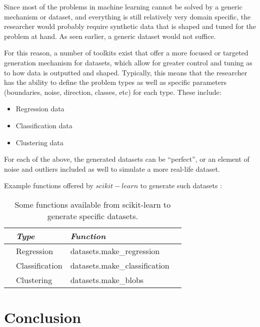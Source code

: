 Since most of the problems in machine learning cannot be solved by a generic mechanism or dataset, and everything is still relatively very domain specific, the researcher would probably require synthetic data that is shaped and tuned for the problem at hand. As seen earlier, a generic dataset would not suffice.

For this reason, a number of toolkits exist that offer a more focused or targeted generation mechanism for datasets, which allow for greater control and tuning as to how data is outputted and shaped. Typically, this means that the researcher has the ability to define the problem types as well as specific parameters (boundaries, noise, direction, classes, etc) for each type. These include:

\begin{itemize}
    \item Regression data
    \item Classification data
    \item Clustering data
\end{itemize}

For each of the above, the generated datasets can be “perfect”, or an element of noise and outliers included as well to simulate a more real-life dataset.

Example functions offered by $scikit-learn$ to generate such datasets \citep{Sarkar2018}:

\begin{table}[ht]
    \centering
    \selectfont
    \begin{tabular}{llll}
      \toprule
                        & \textit{Type} & \textit{Function} \\
      \midrule
      \textit & Regression              & datasets.make\_regression \\
      \textit & Classification          & datasets.make\_classification  \\
      \textit & Clustering              & datasets.make\_blobs  \\
      \bottomrule
    \end{tabular}
    \caption{Some functions available from scikit-learn to generate specific datasets.}
    \label{tab:sf_scikitdatagen}
\end{table}
\vspace{2mm}

\section{Conclusion}

